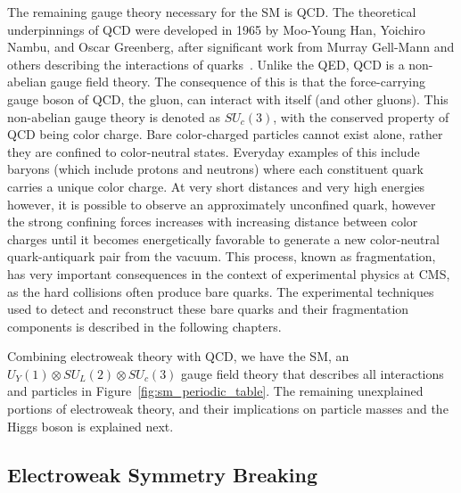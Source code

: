 The remaining gauge theory necessary for the SM is QCD. The theoretical underpinnings of QCD were developed in 1965 by Moo-Young Han, Yoichiro Nambu, and Oscar Greenberg, after
significant work from Murray Gell-Mann and others describing the interactions of quarks~\cite{QCD}.  
Unlike the QED, QCD is a non-abelian gauge field theory. The consequence of this is that the force-carrying gauge boson
of QCD, the gluon, can interact with itself (and other gluons). This non-abelian gauge theory is denoted as $SU_{c}(3)$, with the conserved property of QCD being color charge.
Bare color-charged particles
cannot exist alone, rather they are confined to color-neutral states. Everyday examples of this include baryons (which include protons and neutrons) where each constituent quark
carries a unique color charge. At very short distances and very high energies however, it is possible to observe an approximately unconfined quark, however the strong confining
forces increases with increasing distance between color charges until it becomes energetically favorable to generate a new color-neutral quark-antiquark pair from the vacuum.
This process, known as fragmentation, has very important consequences in the context of experimental physics at CMS, as the hard collisions often produce bare quarks.
The experimental techniques used to detect and reconstruct these bare quarks and their fragmentation components is described in the following chapters. 

Combining electroweak theory with QCD, we have the SM, an $U_{Y}(1) \otimes SU_{L}(2) \otimes SU_{c}(3)$ gauge field theory that describes all interactions and particles in
Figure~\ref{fig:sm_periodic_table}. The remaining unexplained portions of electroweak theory, and their implications on particle masses and the Higgs boson is explained next.   

\subsection{Electroweak Symmetry Breaking}


